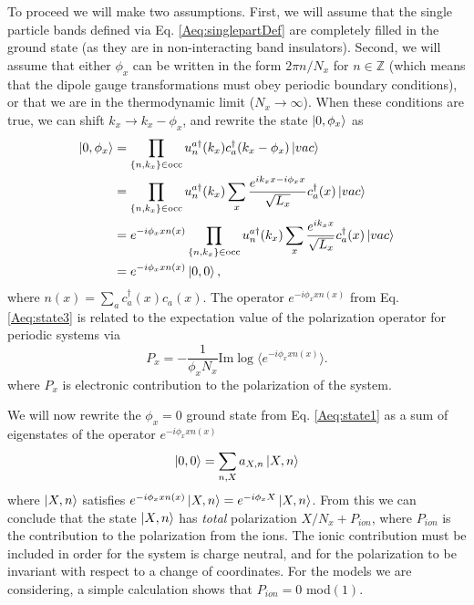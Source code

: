 \documentclass[prb,aps,twocolumn,groupaddress,floatfix]{revtex4-1}
\begin{document}
To proceed we will make two assumptions. First, we will assume that the single particle bands defined via Eq. \ref{Aeq:singlepartDef} are completely filled in the ground state (as they are in non-interacting band insulators). Second, we will assume that either $\phi_x$ can be written in the form $2\pi n/N_x$ for $n \in \mathbb{Z}$ (which means that the dipole gauge transformations must obey periodic boundary conditions), or that we are in the thermodynamic limit ($N_x \rightarrow \infty$). When these conditions are true, we can shift $k_x \rightarrow k_x - \phi_x$, and rewrite the state $\ket{0,\phi_x}$ as
\begin{equation}
\begin{split}
\ket{0,\phi_x} &= \prod_{\{n,k_x\}\in \text{occ}} u^{a\dagger}_n(k_x) c^\dagger_a(k_x-\phi_x)\ket{vac}\\
&= \prod_{\{n,k_x\}\in \text{occ}} u^{a\dagger}_n(k_x) \sum_{x}\frac{e^{i k_x x-i\phi_x x }}{\sqrt{L_x}} c^\dagger_a(x)\ket{vac}\\
& = e^{-i\phi_x x n(x)}\prod_{\{n,k_x\}\in \text{occ}} u^{a\dagger}_n(k_x) \sum_{x}\frac{e^{i k_x x}}{\sqrt{L_x}} c^\dagger_a(x)\ket{vac}\\
& = e^{-i\phi_x x n(x)}\ket{0,0},
\end{split}\label{Aeq:state3}
\end{equation}
where $n(x)=\sum_a c^\dagger_a(x)c_a(x)$. The operator $e^{-i\phi_x x n(x)}$ from Eq. \ref{Aeq:state3} is related to the expectation value of the polarization operator for periodic systems via
\begin{equation}
    P_x = -\frac{1}{\phi_x N_x}\text{Im}\log\langle e^{-i\phi_x x n(x)}\rangle.
\end{equation}
where $P_x$ is electronic contribution to the polarization of the system. 

We will now rewrite the $\phi_x = 0$ ground state from Eq. \ref{Aeq:state1} as a sum of eigenstates of the operator $e^{-i\phi_x x n(x)}$
\begin{equation}
\begin{split}
\ket{0,0} &= \sum_{n,X} a_{X,n} \ket{X,n}\\
\end{split}\label{Aeq:state4}
\end{equation}
where $\ket{X,n}$ satisfies $e^{-i\phi_x x n(x)}\ket{X,n} = e^{-i\phi_x X}\ket{X,n} $. From this we can conclude that the state $\ket{X,n}$ has \textit{total} polarization $X/N_x + P_{ion}$, where $P_{ion}$ is the contribution to the polarization from the ions. The ionic contribution must be included in order for the system is charge neutral, and for the polarization to be invariant with respect to a change of coordinates. For the models we are considering, a simple calculation shows that $P_{ion} = 0$ mod$(1)$. 
\end{document}
